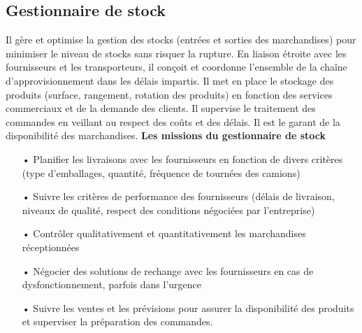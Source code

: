 \documentclass[edit,12pt,a4paper,ChapStyle,oneside,doubleinterligne]{report}
\begin{document}
\subsection{Gestionnaire de stock}
Il gère et optimise la gestion des stocks (entrées et sorties des marchandises) pour minimiser le niveau de stocks sans risquer la rupture. En liaison étroite avec les fournisseurs et les transporteurs, il conçoit et coordonne l'ensemble de la chaîne d'approvisionnement dans les délais impartis. Il met en place le stockage des produits (surface, rangement, rotation des produits) en fonction des services commerciaux et de la demande des clients. Il supervise le traitement des commandes en veillant au respect des coûts et des délais. Il est le garant de la disponibilité des marchandises\cite{Gestionnaire}.
\newline\newline\textbf{Les missions du gestionnaire de stock}\newline
\begin{itemize}
    \item [•] Planifier les livraisons avec les fournisseurs en fonction de divers critères (type d'emballages, quantité, fréquence de tournées des camions)
    \item [•]	Suivre les critères de performance des fournisseurs (délais de livraison, niveaux de qualité, respect des conditions négociées par l'entreprise)
    \item [•]   Contrôler qualitativement et quantitativement les marchandises réceptionnées
    \item [•]   Négocier des solutions de rechange avec les fournisseurs en cas de dysfonctionnement, parfois dans l'urgence
    \item [•]   Suivre les ventes et les prévisions pour assurer la disponibilité des produits et superviser la préparation des commandes.
\end{itemize}
\end{document}
